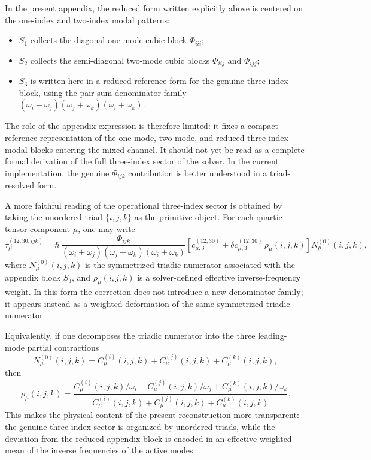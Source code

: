 \documentclass[aip,jcp,reprint]{revtex4-2}
\begin{document}
\begin{widetext}
In the present appendix, the reduced form written explicitly above is
centered on the one-index and two-index modal patterns:
\begin{itemize}
\item $S_1$ collects the diagonal one-mode cubic block $\Phi_{iii}$;
\item $S_2$ collects the semi-diagonal two-mode cubic blocks
      $\Phi_{iij}$ and $\Phi_{ijj}$;
\item $S_3$ is written here in a reduced reference form for the genuine
      three-index block, using the pair-sum denominator family
      $(\omega_i+\omega_j)(\omega_j+\omega_k)(\omega_i+\omega_k)$.
\end{itemize}

The role of the appendix expression is therefore limited: it fixes a
compact reference representation of the one-mode, two-mode, and reduced
three-index modal blocks entering the mixed channel. It should not yet
be read as a complete formal derivation of the full three-index sector
of the solver. In the current implementation, the genuine
$\Phi_{ijk}$ contribution is better understood in a triad-resolved form.

A more faithful reading of the operational three-index sector is obtained
by taking the unordered triad $\{i,j,k\}$ as the primitive object. For
each quartic tensor component $\mu$, one may write
\begin{equation}
\tau^{(12,30;ijk)}_\mu
=
\hbar\,
\frac{\Phi_{ijk}}
     {(\omega_i+\omega_j)(\omega_j+\omega_k)(\omega_i+\omega_k)}
\left[
c^{(12,30)}_{\mu,3}
+ \delta c^{(12,30)}_{\mu,3}\,\rho_\mu(i,j,k)
\right]
N^{(0)}_\mu(i,j,k),
\end{equation}
where $N^{(0)}_\mu(i,j,k)$ is the symmetrized triadic numerator associated
with the appendix block $S_3$, and $\rho_\mu(i,j,k)$ is a solver-defined
effective inverse-frequency weight. In this form the correction does not
introduce a new denominator family; it appears instead as a weighted
deformation of the same symmetrized triadic numerator.

Equivalently, if one decomposes the triadic numerator into the three
leading-mode partial contractions
\begin{equation}
N^{(0)}_\mu(i,j,k)=
C^{(i)}_\mu(i,j,k)+C^{(j)}_\mu(i,j,k)+C^{(k)}_\mu(i,j,k),
\end{equation}
then
\begin{equation}
\rho_\mu(i,j,k)=
\frac{
C^{(i)}_\mu(i,j,k)/\omega_i+
C^{(j)}_\mu(i,j,k)/\omega_j+
C^{(k)}_\mu(i,j,k)/\omega_k
}{
C^{(i)}_\mu(i,j,k)+
C^{(j)}_\mu(i,j,k)+
C^{(k)}_\mu(i,j,k)
}.
\end{equation}
This makes the physical content of the present reconstruction more
transparent: the genuine three-index sector is organized by unordered
triads, while the deviation from the reduced appendix block is encoded in
an effective weighted mean of the inverse frequencies of the active
modes.


\end{widetext}
\end{document}
